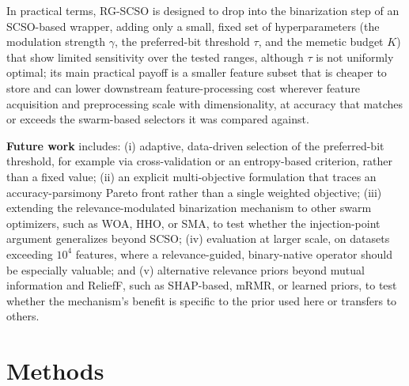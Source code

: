 \documentclass[preprint,3p,times]{elsarticle}
\begin{document}
In practical terms, RG-SCSO is designed to drop into the binarization step of
an SCSO-based wrapper, adding only a small, fixed set of hyperparameters (the
modulation strength $\gamma$, the preferred-bit threshold $\tau$, and the
memetic budget $K$) that show limited sensitivity over the tested ranges,
although $\tau$ is not uniformly optimal; its main
practical payoff is a smaller feature subset that is cheaper to store and can
lower downstream feature-processing cost wherever feature acquisition and
preprocessing scale with dimensionality, at accuracy that matches or exceeds
the swarm-based selectors it was compared against.

\textbf{Future work} includes: (i) adaptive, data-driven selection of the
preferred-bit threshold, for example via cross-validation or an
entropy-based criterion, rather than a fixed value; (ii) an explicit
multi-objective formulation that traces an accuracy-parsimony Pareto front
rather than a single weighted objective; (iii) extending the
relevance-modulated binarization mechanism to other swarm optimizers, such
as WOA, HHO, or SMA, to test whether the injection-point argument
generalizes beyond SCSO; (iv) evaluation at larger scale, on datasets
exceeding $10^4$ features, where a relevance-guided, binary-native operator
should be especially valuable; and (v) alternative relevance priors beyond
mutual information and ReliefF, such as SHAP-based, mRMR, or learned
priors, to test whether the mechanism's benefit is specific to the prior
used here or transfers to others.

\FloatBarrier
\section{Methods}
\label{sec:method}
\end{document}
